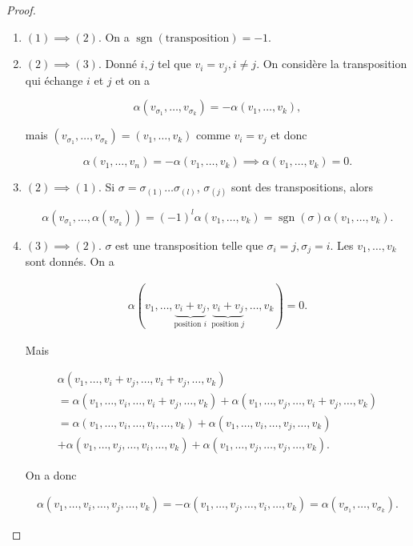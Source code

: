 \documentclass[french]{article}
\begin{document}
\begin{proof}

  \

  \begin{enumerate}
    \item \((1) \implies (2)\). On a \(\operatorname{sgn}(\text{transposition}) = -1\).
    \item \((2) \implies (3)\). Donné \(i,j\) tel que \(v_i = v_j, i \neq j\). On considère la transposition qui échange \(i\) et \(j\) et on a

    \[\alpha(v _{\sigma_1}, \dots, v _{\sigma_k}) = - \alpha(v_1, \dots, v_k), \]

    mais \((v _{\sigma_1}, \dots, v _{\sigma_k}) = (v_1, \dots, v_k)\) comme \(v_i = v_j\) et donc

    \[\alpha(v_1, \dots, v_n) = - \alpha(v_1, \dots, v_k) \implies \alpha(v_1, \dots,v_k) = 0.\]

    \item \((2) \implies (1)\). Si \(\sigma = \sigma _{(1)} \dots \sigma _{(l)}\), \(\sigma _{(j)}\) sont des transpositions, alors

    \[\alpha(v _{\sigma_1}, \dots, \alpha(v _{\sigma_k})) = (-1) ^{l}\alpha(v_1, \dots, v_k) = \operatorname{sgn}(\sigma)\alpha(v_1, \dots, v_k).\]

    \item \((3) \implies (2)\). \(\sigma\) est une transposition telle que \(\sigma_i = j, \sigma_j = i\). Les \(v_1, \dots, v_k\) sont donnés. On a

    \begin{gather*}
      \alpha(v_1, \dots, \underbrace{v_i+v_j}_{\text{position }i}, \underbrace{v_i+ v_j}_{\text{position }j}, \dots, v_k) = 0.
    \end{gather*}

    Mais

    \begin{gather*}
      \alpha(v_1, \dots, v_i + v_j, \dots, v_i + v_j, \dots, v_k) \\
       = \alpha(v_1, \dots, v_i, \dots, v_i+v_j, \dots, v_k) + \alpha(v_1, \dots, v_j, \dots, v_i+v_j, \dots, v_k) \\
      = \alpha(v_1, \dots, v_i, \dots, v_i, \dots, v_k) + \alpha(v_1, \dots, v_i, \dots, v_j, \dots, v_k) \\
      + \alpha(v_1, \dots, v_j,\dots, v_i, \dots, v_k) + \alpha(v_1, \dots, v_j, \dots, v_j, \dots, v_k).
    \end{gather*}

    On a donc

    \begin{gather*}
      \alpha(v_1, \dots, v_i, \dots, v_j, \dots, v_k) = -\alpha(v_1, \dots, v_j, \dots, v_i, \dots, v_k) = \alpha(v _{\sigma_1}, \dots, v _{\sigma_k}).
    \end{gather*}
  \end{enumerate}
\end{proof}
\end{document}
